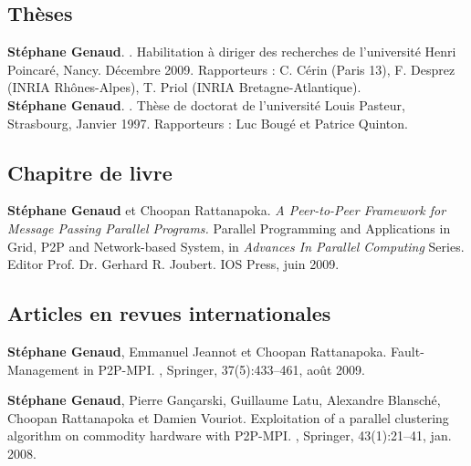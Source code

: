\documentclass[11pt]{article}
\begin{document}
\small

\begin{thebibliography}{99}

\subsection*{Thèses}

\textbf{Stéphane Genaud}.
.
\newblock Habilitation à diriger des recherches de l'université Henri Poincaré, Nancy. Décembre 2009.
\newblock Rapporteurs : C. Cérin (Paris 13), F. Desprez (INRIA Rhônes-Alpes), T. Priol (INRIA Bretagne-Atlantique).\\[2mm]

\textbf{Stéphane Genaud}.
.
\newblock Thèse de doctorat de l'université Louis Pasteur, Strasbourg, Janvier 1997.
\newblock Rapporteurs : Luc Bougé et Patrice Quinton. 

\subsection*{Chapitre de livre}

\textbf{Stéphane Genaud} et Choopan Rattanapoka.
\newblock \emph{A Peer-to-Peer Framework for Message Passing Parallel Programs.}
\newblock Parallel Programming and Applications in Grid, P2P and Network-based System,
in {\em Advances In Parallel Computing} Series. Editor Prof. Dr. Gerhard R. Joubert.
IOS Press, juin 2009. 
 

\subsection*{Articles en revues internationales}

\setlength{\itemsep}{1.5mm}


\newblock \textbf{Stéphane Genaud}, Emmanuel Jeannot et Choopan Rattanapoka.
\newblock Fault-Management in P2P-MPI.
, Springer, 
37(5):433--461, août 2009.


\textbf{Stéphane Genaud}, Pierre Gançarski, Guillaume Latu, Alexandre Blansché, 
Choopan Rattanapoka et Damien Vouriot. \newblock Exploitation of a parallel 
clustering algorithm on commodity hardware with P2P-MPI.
, Springer, 43(1):21--41, jan. 2008.



\end{thebibliography}
\end{document}
